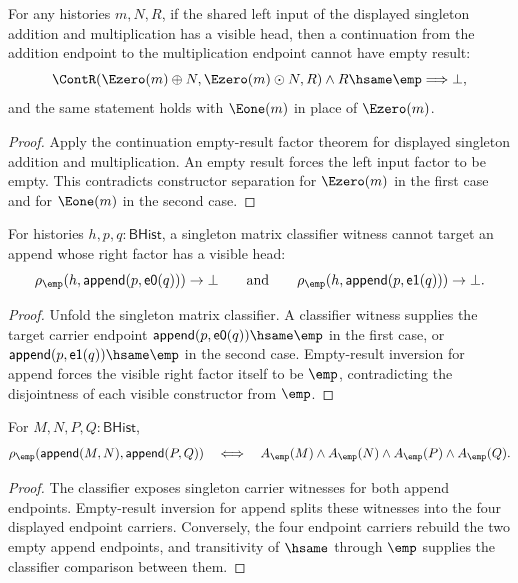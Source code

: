 \begin{theorem}
\label{thm:matrix-singleton-addmul-visible-left-continuation-result-nonempty}
For any histories $m,N,R$, if the shared left input of the displayed singleton
addition and multiplication has a visible head, then a continuation from the
addition endpoint to the multiplication endpoint cannot have empty result:
$$
\ContR(\Ezero(m)\oplus N,\Ezero(m)\odot N,R)\land R\hsame\emp
\Longrightarrow\bot,
$$
and the same statement holds with $\Eone(m)$ in place of $\Ezero(m)$.
\end{theorem}
\begin{proof}
Apply the continuation empty-result factor theorem for displayed singleton
addition and multiplication. An empty result forces the left input factor to
be empty. This contradicts constructor separation for $\Ezero(m)$ in the first
case and for $\Eone(m)$ in the second case.
\end{proof}

\begin{theorem}
\label{thm:matrix-singleton-classifier-append-visible-right-absurd}
For histories $h,p,q:\mathsf{BHist}$, a singleton matrix classifier witness
cannot target an append whose right factor has a visible head:
$$
\rho_{\emp}(h,\mathsf{append}(p,\mathsf{e0}(q)))\to\bot
\qquad\text{and}\qquad
\rho_{\emp}(h,\mathsf{append}(p,\mathsf{e1}(q)))\to\bot.
$$
\end{theorem}
\begin{proof}
Unfold the singleton matrix classifier. A classifier witness supplies the
target carrier endpoint
$\mathsf{append}(p,\mathsf{e0}(q))\hsame\emp$ in the first case, or
$\mathsf{append}(p,\mathsf{e1}(q))\hsame\emp$ in the second case. Empty-result
inversion for append forces the visible right factor itself to be $\emp$,
contradicting the disjointness of each visible constructor from $\emp$.
\end{proof}

\begin{theorem}
\label{thm:matrix-singleton-classifier-append-pair-carrier}
For $M,N,P,Q:\mathsf{BHist}$,
$$
\rho_{\emp}(\mathsf{append}(M,N),\mathsf{append}(P,Q))
\quad\Longleftrightarrow\quad
A_{\emp}(M)\land A_{\emp}(N)\land A_{\emp}(P)\land A_{\emp}(Q).
$$
\end{theorem}
\begin{proof}
The classifier exposes singleton carrier witnesses for both append endpoints.
Empty-result inversion for append splits these witnesses into the four displayed
endpoint carriers. Conversely, the four endpoint carriers rebuild the two empty
append endpoints, and transitivity of $\hsame$ through $\emp$ supplies the
classifier comparison between them.
\end{proof}

